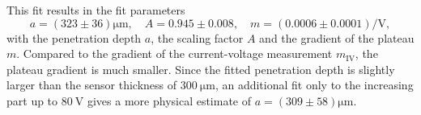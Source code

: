 This fit results in the fit parameters
\begin{equation}
    a=\left(\num{323}\pm\num{36}\right)\si{\micro\meter}, \quad
    A=\num{0.945}\pm\num{0.008}, \quad
    m=\left(\num{0.0006}\pm\num{0.0001}\right)\si{\per\volt},
\end{equation}
with the penetration depth $a$, the scaling factor $A$ and the gradient of the plateau $m$. Compared to the gradient of the current-voltage measurement
$m_{\text{IV}}$, the plateau gradient is much smaller. Since the fitted penetration depth is slightly larger than the sensor thickness of $\SI{300}{\micro\meter}$, an additional fit only to the increasing part up to $\SI{80}{\volt}$ gives a more physical estimate of $a=\left(\num{309}\pm\num{58}\right)\si{\micro\meter}$.

